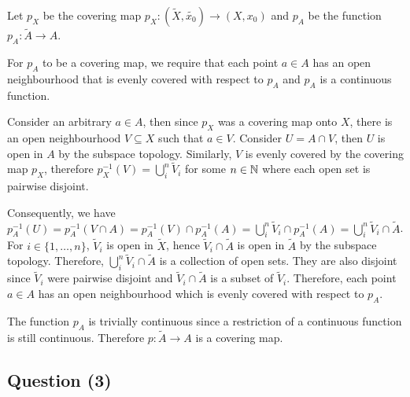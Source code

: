 \documentclass{article}
\begin{document}
\begin{flushleft}
    Let $p_{X}$ be the covering map $p_{X} : (\tilde{X}, \tilde{x_0}) \rightarrow (X, x_0)$ and $p_{A}$ be the function $p_{A} : \tilde{A} \rightarrow A$. \newline
    
    For $p_{A}$ to be a covering map, we require that each point $a \in A$ has an open neighbourhood that is evenly covered with respect to $p_{A}$ and $p_{A}$ is a continuous function. \newline
    
    Consider an arbitrary $a \in A$, then since $p_{X}$ was a covering map onto $X$, there is an open neighbourhood $V \subseteq X$ such that $a \in V$. Consider $U = A \cap V$, then $U$ is open in $A$ by the subspace topology. Similarly, $V$ is evenly covered by the covering map $p_{X}$, therefore $p_{X}^{-1}(V) = \bigcup_i^{n} \tilde{V}_i$ for some $n \in \mathbb{N}$ where each open set is pairwise disjoint. \newline
    
    Consequently, we have $p_{A}^{-1}(U) = p_{A}^{-1}(V \cap A) = p_{A}^{-1}(V) \cap p_{A}^{-1}(A) = \bigcup_i^n \tilde{V}_i \cap p_{A}^{-1}(A) = \bigcup_i^n \tilde{V}_i \cap \tilde{A}$. For $i \in \{1, \dots, n\}$, $\tilde{V}_i$ is open in $\tilde{X}$, hence $\tilde{V}_i \cap \tilde{A}$ is open in $\tilde{A}$ by the subspace topology. Therefore, $\bigcup_i^n \tilde{V}_i \cap \tilde{A}$ is a collection of open sets. They are also disjoint since $\tilde{V}_i$ were pairwise disjoint and $\tilde{V}_i \cap \tilde{A}$ is a subset of $\tilde{V}_i$. Therefore, each point $a \in A$ has an open neighbourhood which is evenly covered with respect to $p_{A}$. \newline

    The function $p_{A}$ is trivially continuous since a restriction of a continuous function is still continuous. Therefore $p : \tilde{A} \rightarrow A$ is a covering map.
\end{flushleft}

\begin{center}
    \section*{Question (3)}
\end{center}
\end{document}
